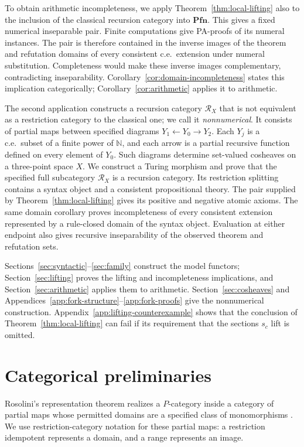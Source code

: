 \documentclass[11pt]{article}
\newcommand{\N}{\mathbb N}
\newcommand{\Pfn}{\mathbf{Pfn}}
\begin{document}
To obtain arithmetic incompleteness, we apply
Theorem~\ref{thm:local-lifting} also to the inclusion of the classical
recursion category into $\Pfn$. This gives a fixed numerical
inseparable pair. Finite computations give PA-proofs of its numeral
instances. The pair is therefore contained in the inverse images of
the theorem and refutation domains of every consistent c.e.\ extension
under numeral substitution. Completeness would make these inverse
images complementary, contradicting inseparability.
Corollary~\ref{cor:domain-incompleteness} states this implication
categorically; Corollary~\ref{cor:arithmetic} applies it to arithmetic.

The second application constructs a recursion category $\mathscr R_X$
that is not equivalent as a restriction category to the classical
one; we call it \emph{nonnumerical}. It consists of partial maps
between specified diagrams $Y_1\leftarrow Y_0\to Y_2$.
Each $Y_j$ is a c.e.\ subset of a finite power of $\N$, and each arrow
is a partial recursive function defined on every element of $Y_0$.
Such diagrams determine set-valued cosheaves on a three-point space $X$.
We construct a Turing morphism and prove that the specified full
subcategory $\mathscr R_X$ is a recursion category. Its restriction
splitting contains a syntax object and a consistent propositional
theory. The pair supplied by Theorem~\ref{thm:local-lifting} gives
its positive and negative atomic axioms. The same domain corollary
proves incompleteness of every consistent extension represented by a
rule-closed domain of the syntax object. Evaluation at either endpoint
also gives recursive inseparability of the observed theorem and
refutation sets.

Sections~\ref{sec:syntactic}--\ref{sec:family} construct the model
functors; Section~\ref{sec:lifting} proves the lifting and
incompleteness implications, and Section~\ref{sec:arithmetic}
applies them to arithmetic. Section~\ref{sec:cosheaves} and
Appendices~\ref{app:fork-structure}--\ref{app:fork-proofs} give the
nonnumerical construction. Appendix~\ref{app:lifting-counterexample}
shows that the conclusion of Theorem~\ref{thm:local-lifting} can fail
if its requirement that the sections $s_c$ lift is omitted.

\section{Categorical preliminaries}\label{sec:preliminaries}

Rosolini's representation theorem realizes a $P$-category inside a
category of partial maps whose permitted domains are a specified
class of monomorphisms \cite[Theorem 1.2]{Rosolini}.
We use restriction-category notation for these partial maps: a
restriction idempotent represents a domain, and a range represents
an image.
\end{document}
